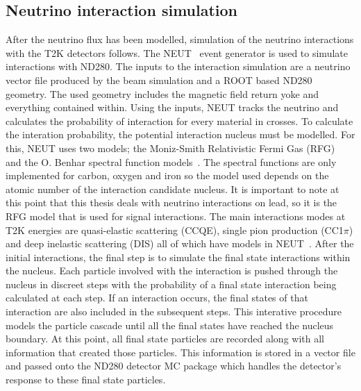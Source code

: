 \subsection{Neutrino interaction simulation}
\label{subsec:NeutrinoInteractionSimulation}
After the neutrino flux has been modelled, simulation of the neutrino interactions with the T2K detectors follows.  The NEUT~\cite{Hayato2002171} event generator is used to simulate interactions with ND280.  The inputs to the interaction simulation are a neutrino vector file produced by the beam simulation and a ROOT based ND280 geometry.  The used geometry includes the magnetic field return yoke and everything contained within.  Using the inputs, NEUT tracks the neutrino and calculates the probability of interaction for every material in crosses.  To calculate the interation probability, the potential interaction nucleus must be modelled.  For this, NEUT uses two models; the Moniz-Smith Relativistic Fermi Gas (RFG)~\cite{Miller2002223} and the O. Benhar spectral function models~\cite{Benhar1994493}.  The spectral functions are only implemented for carbon, oxygen and iron so the model used depends on the atomic number of the interaction candidate nucleus.  It is important to note at this point that this thesis deals with neutrino interactions on lead, so it is the RFG model that is used for signal interactions.
\newline 
The main interactions modes at T2K energies are quasi-elastic scattering (CCQE), single pion production  (CC1$\pi$) and deep inelastic scattering (DIS) all of which have models in NEUT~\cite{LlewellynSmith1972261,Rein198179,1126-6708-2006-05-026}.
\newline
After the initial interactions, the final step is to simulate the final state interactions within the nucleus.  Each particle involved with the interaction is pushed through the nucleus in discreet steps with the probability of a final state interaction being calculated at each step.  If an interaction occurs, the final states of that interaction are also included in the subsequent steps.  This interative procedure models the particle cascade until all the final states have reached the nucleus boundary.  At this point, all final state particles are recorded along with all information that created those particles.  This information is stored in a vector file and passed onto the ND280 detector MC package which handles the detector's response to these final state particles.
